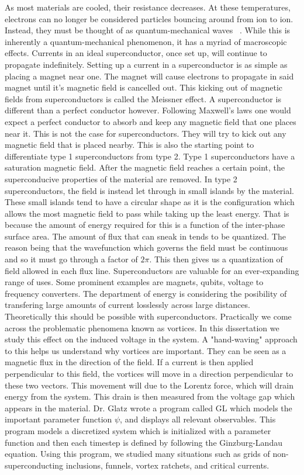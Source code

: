 As most materials are cooled, their resistance decreases. At these temperatures, electrons can no longer be considered particles bouncing around from ion to ion. Instead, they must be thought of as quantum-mechanical waves ~\cite{Miszczak15}. While this is inherently a quantum-mechanical phenomenon, it has a myriad of macroscopic effects. Currents in an ideal superconductor, once set up, will continue to propagate indefinitely. Setting up a current in a superconductor is as simple as placing a magnet near one. The magnet will cause electrons to propagate in said magnet until it's magnetic field is cancelled out. This kicking out of magnetic fields from superconductors is called the Meissner effect. A superconductor is different than a perfect conductor however. Following Maxwell's laws one would expect a perfect conductor to absorb and keep any magnetic field that one places near it. This is not the case for superconductors. They will try to kick out any magnetic field that is placed nearby. This is also the starting point to differentiate type 1 superconductors from type 2. Type 1 superconductors have a saturation magnetic field. After the magnetic field reaches a certain point, the superconducive properties of the material are removed. In type 2 superconductors, the field is instead let through in small islands by the material. These small islands tend to have a circular shape as it is the configuration which allows the most magnetic field to pass while taking up the least energy. That is because the amount of energy required for this is a function of the inter-phase surface area. The amount of flux that can sneak in tends to be quantized. The reason being that the wavefunction which governs the field must be continuous and so it must go through a factor of $2\pi$. This then gives us a quantization of field allowed in each flux line.  
Superconductors are valuable for an ever-expanding range of uses. Some prominent examples are magnets, qubits, voltage to frequency converters. The department of energy is considering the posibility of transfering large amounts of current losslessly across large distances. Theoretically this should be possible with superconductors. Practically we come across the problematic phenomena known as vortices.  In this dissertation we study this effect on the induced voltage in the system. A "hand-waving" approach to this helps us understand why vortices are important. They can be seen as a magnetic flux in the direction of the field. If a current is then applied perpendicular to this field, the vortices will move in a direction perpendicular to these two vectors. This movement will due to the Lorentz force, which will drain energy from the system. This drain is then measured from the voltage gap which appears in the material. Dr. Glatz wrote a program called {\sc GL} which models the important parameter function $\psi$, and displays all relevant observables. This program models a discretized system which is initialized with a parameter function and then each timestep is defined by following the Ginzburg-Landau equation. Using this program, we studied many situations such as grids of non-superconducting inclusions, funnels, vortex ratchets, and critical currents. 

